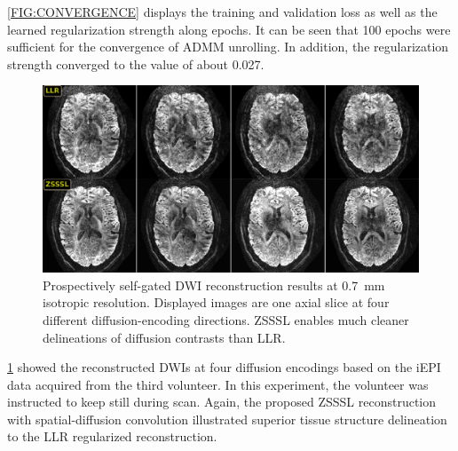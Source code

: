 \documentclass[journal,twoside,web]{ieeecolor}
\begin{document}
	\cref{FIG:CONVERGENCE} displays the training and validation loss
	as well as the learned regularization strength along epochs.
	It can be seen that 100 epochs were sufficient for
	the convergence of ADMM unrolling.
	In addition, the regularization strength converged
	to the value of about 0.027.


	\begin{figure}
		\includegraphics[width=\textwidth]{../figures/fig6.png}
		\caption{Prospectively self-gated DWI reconstruction results
			at 0.7~mm isotropic resolution. Displayed images are
			one axial slice at four different diffusion-encoding directions.
			ZSSSL enables much cleaner delineations of diffusion contrasts
			than LLR.}
		\label{FIG:SG_ZSSSL_VOL3}
	\end{figure}

	\cref{FIG:SG_ZSSSL_VOL3} showed the reconstructed DWIs
	at four diffusion encodings based on the iEPI data
	acquired from the third volunteer.
	In this experiment, the volunteer was instructed
	to keep still during scan.
	Again, the proposed ZSSSL reconstruction
	with spatial-diffusion convolution illustrated
	superior tissue structure delineation
	to the LLR regularized reconstruction.

\end{document}
